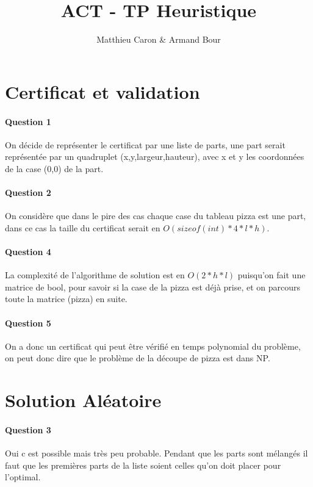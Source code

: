 \documentclass[a4paper,10pt]{report}
\title{ACT - TP Heuristique}
\author{Matthieu Caron & Armand Bour}
\begin{document}
\maketitle

\section{Certificat et validation}

\paragraph{Question 1}
On décide de représenter le certificat par une liste de parts, une part serait représentée par 
un quadruplet (x,y,largeur,hauteur), avec x et y les coordonnées de la case (0,0) de la part.

\paragraph{Question 2}
On considère que dans le pire des cas chaque case du tableau pizza est une part, dans ce cas la taille du certificat
serait en $O(sizeof(int)*4*l*h)$.

\paragraph{Question 4}
La complexité de l'algorithme de solution est en $O(2*h*l)$ puisqu'on fait une matrice de bool, pour savoir si la case de la pizza est déjà prise,
et on parcours toute la matrice (pizza) en suite.

\paragraph{Question 5}
On a donc un certificat qui peut être vérifié en temps polynomial du problème, on peut donc dire que le problème de la découpe de pizza est dans NP.

\section{Solution Aléatoire}
\paragraph{Question 3}
Oui c est possible mais très peu probable. Pendant que les parts sont mélangés il faut que les premières parts de la liste soient celles qu'on doit placer pour l'optimal.







\begin{abstract}
\end{abstract}
\end{document}
